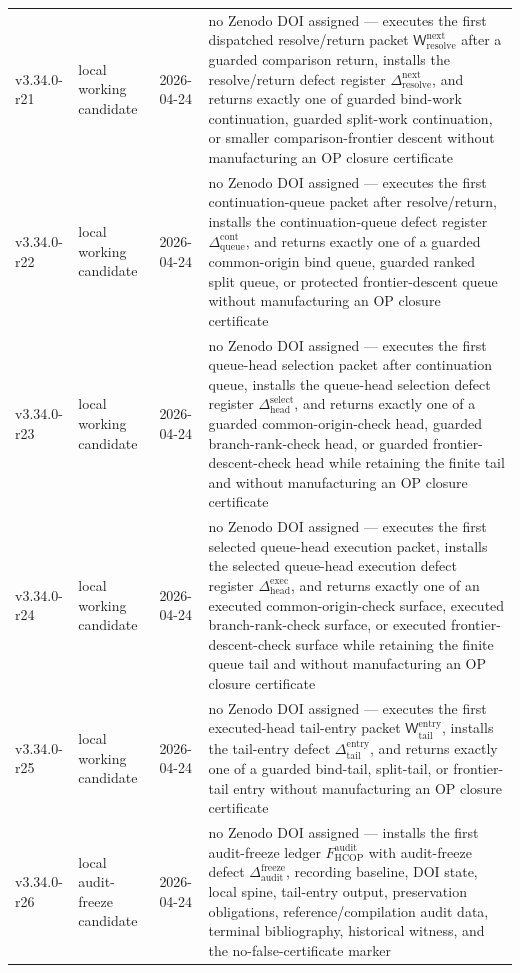 {\begin{longtable}{|p{}|p{}|p{}|p{}|}
v3.34.0-r21 & local working candidate & 2026-04-24 & no Zenodo DOI assigned --- executes the first dispatched resolve/return packet \(\mathsf W_{\mathrm{resolve}}^{\mathrm{next}}\) after a guarded comparison return, installs the resolve/return defect register \(\Delta_{\mathrm{resolve}}^{\mathrm{next}}\), and returns exactly one of guarded bind-work continuation, guarded split-work continuation, or smaller comparison-frontier descent without manufacturing an OP closure certificate \\
v3.34.0-r22 & local working candidate & 2026-04-24 & no Zenodo DOI assigned --- executes the first continuation-queue packet after resolve/return, installs the continuation-queue defect register \(\Delta_{\mathrm{queue}}^{\mathrm{cont}}\), and returns exactly one of a guarded common-origin bind queue, guarded ranked split queue, or protected frontier-descent queue without manufacturing an OP closure certificate \\
v3.34.0-r23 & local working candidate & 2026-04-24 & no Zenodo DOI assigned --- executes the first queue-head selection packet after continuation queue, installs the queue-head selection defect register \(\Delta_{\mathrm{head}}^{\mathrm{select}}\), and returns exactly one of a guarded common-origin-check head, guarded branch-rank-check head, or guarded frontier-descent-check head while retaining the finite tail and without manufacturing an OP closure certificate \\
v3.34.0-r24 & local working candidate & 2026-04-24 & no Zenodo DOI assigned --- executes the first selected queue-head execution packet, installs the selected queue-head execution defect register \(\Delta_{\mathrm{head}}^{\mathrm{exec}}\), and returns exactly one of an executed common-origin-check surface, executed branch-rank-check surface, or executed frontier-descent-check surface while retaining the finite queue tail and without manufacturing an OP closure certificate \\
v3.34.0-r25 & local working candidate & 2026-04-24 & no Zenodo DOI assigned --- executes the first executed-head tail-entry packet \(\mathsf W_{\mathrm{tail}}^{\mathrm{entry}}\), installs the tail-entry defect \(\Delta_{\mathrm{tail}}^{\mathrm{entry}}\), and returns exactly one of a guarded bind-tail, split-tail, or frontier-tail entry without manufacturing an OP closure certificate \\
v3.34.0-r26 & local audit-freeze candidate & 2026-04-24 & no Zenodo DOI assigned --- installs the first audit-freeze ledger \(F_{\mathrm{HCOP}}^{\mathrm{audit}}\) with audit-freeze defect \(\Delta_{\mathrm{audit}}^{\mathrm{freeze}}\), recording baseline, DOI state, local spine, tail-entry output, preservation obligations, reference/compilation audit data, terminal bibliography, historical witness, and the no-false-certificate marker \\

\end{longtable}}
